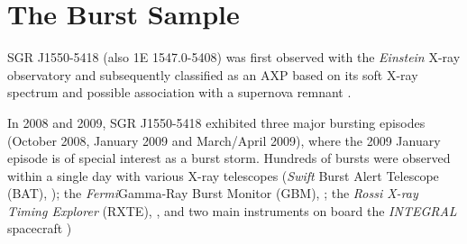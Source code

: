 \documentclass[12pt]{emulateapj}
\newcommand{\project}[1]{\textsl{#1}}
\newcommand{\fermi}{\project{Fermi}}
\begin{document}

\section{The Burst Sample}
\label{sec:data}

SGR J1550-5418 (also 1E 1547.0-5408) was first observed with the {\it Einstein} X-ray observatory \citep{lamb1981}
and subsequently classified as an AXP based on its soft X-ray spectrum and possible association with a supernova remnant \citep{gelfand2007}.

In 2008 and 2009, SGR J1550-5418 exhibited three major bursting episodes (October 2008, January 2009 and March/April 2009), where the 2009 January episode is of special interest as a
burst storm. Hundreds of bursts were observed within a single day with various X-ray telescopes ({\it Swift} Burst Alert Telescope (BAT), \citealp{israel2010, scholz2011}); the \fermi Gamma-Ray Burst Monitor (GBM), \citealp{kaneko2010,vonkienlin2012,vanderhorst2012}; the {\it Rossi X-ray Timing Explorer} (RXTE), \citep{dib2012}, and two main instruments on board the {\it INTEGRAL} spacecraft \citealp{mereghetti2009, savchenko2010})
 
\end{document}

